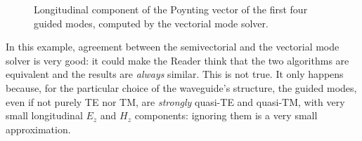 \begin{figure}[htbp]
  \begin{center}
  \end{center}
  \caption{Longitudinal component of the Poynting vector of the first
    four guided modes, computed by the vectorial mode solver.}
  \label{fig:wmm1_lusse}
\end{figure}  

In this example, agreement between the semivectorial and the vectorial
mode solver is very good: it could make the Reader think that the two
algorithms are equivalent and the results are \emph{always}
similar. This is not true. It only happens because, for the particular
choice of the waveguide's structure, the guided
modes, even if not purely TE nor TM, are \emph{strongly} quasi-TE and
quasi-TM, with very small longitudinal $E_z$ and $H_z$ components:
ignoring them is a very small approximation.


